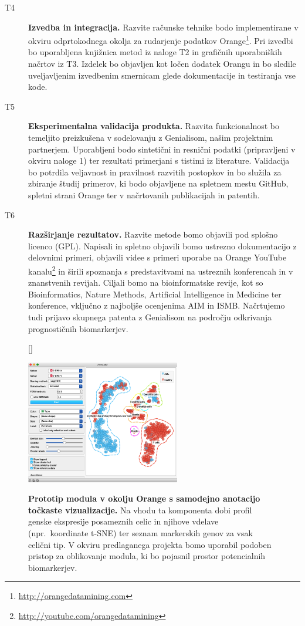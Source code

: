 \documentclass[11pt,a4paper]{article}
\newcommand{\myurl}[1]{\footnote{\url{#1}}}
\renewcommand{\bold}{\textbf}
\begin{document}
\begin{description}
 	\item[T4] \bold{Izvedba in integracija.} Razvite računske tehnike bodo implementirane v okviru odprtokodnega okolja za rudarjenje podatkov Orange\myurl{http://orangedatamining.com}. Pri izvedbi bo uporabljena knjižnica metod iz naloge T2 in grafičnih uporabniških načrtov iz T3. Izdelek bo objavljen kot ločen dodatek Orangu in bo sledile uveljavljenim izvedbenim smernicam glede dokumentacije in testiranja vse kode.
 	\item[T5] \bold{Eksperimentalna validacija produkta.} Razvita funkcionalnost bo temeljito preizkušena v sodelovanju z Genialisom, našim projektnim partnerjem. Uporabljeni bodo sintetični in resnični podatki (pripravljeni v okviru naloge 1) ter rezultati primerjani s tistimi iz literature. Validacija bo potrdila veljavnost in pravilnost razvitih postopkov in bo služila za zbiranje študij primerov, ki bodo objavljene na spletnem mestu GitHub, spletni strani Orange ter v načrtovanih publikacijah in patentih.
 	\item[T6] \bold{Razširjanje rezultatov.} Razvite metode bomo objavili pod splošno licenco (GPL). Napisali in spletno objavili bomo ustrezno dokumentacijo z delovnimi primeri, objavili videe s primeri uporabe na Orange YouTube kanalu\myurl{http://youtube.com/orangedatamining} in širili spoznanja s predstavitvami na ustreznih konferencah in v znanstvenih revijah. Ciljali bomo na bioinformatske revije, kot so Bioinformatics, Nature Methods, Artificial Intelligence in Medicine ter konference, vključno z najboljše ocenjenima AIM in ISMB. Načrtujemo tudi prijavo skupnega patenta z Genialisom na področju odkrivanja prognostičnih biomarkerjev.
\end{description}


\begin{figure}
[\FBwidth]
{\caption{\small\bold{Prototip modula v okolju Orange s samodejno anotacijo točkaste vizualizacije.} Na vhodu ta komponenta dobi profil genske ekspresije posameznih celic in njihove vdelave (npr.~koordinate t-SNE) ter seznam markerskih genov za vsak celični tip. V okviru predlaganega projekta bomo uporabil podoben pristop za oblikovanje modula, ki bo pojasnil prostor potencialnih biomarkerjev.}
\label{fig:annotation}}
{\includegraphics[width=0.6\textwidth]{annotation}}
\end{figure}
\end{document}
